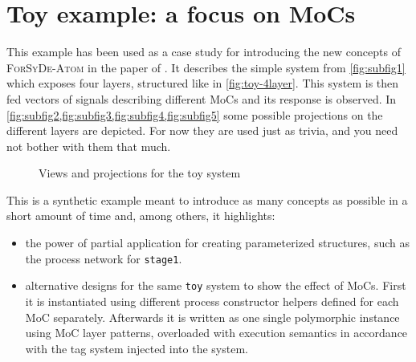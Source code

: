 \section{Toy example: a focus on MoCs}
\label{sec:getting-started:toy-example}

This example has been used as a case study for introducing the new concepts of \textsc{ForSyDe-Atom} in the paper of \cite{Ungureanu17}. It describes the simple system from \cref{fig:subfig1} which exposes four layers, structured like in \cref{fig:toy-4layer}. This system is then fed vectors of signals describing different MoCs and its response is observed. In \cref{fig:subfig2,fig:subfig3,fig:subfig4,fig:subfig5} some possible projections on the different layers are depicted. For now they are used just as trivia, and you need not bother with them that much.
\vspace{-.4cm}
\begin{figure}[ht!]
  \centering
  \hfill
  \hfill
  \hfill
  \hfill
  \hfill
\caption{Views and projections for the toy system}\label{fig:application}
\end{figure}

This is a synthetic example meant to introduce as many concepts as possible in a short amount of time and, among others, it highlights:
\begin{itemize}
\item the power of partial application for creating parameterized structures, such as the process network for \texttt{stage1}.
\item alternative designs for the same \texttt{toy} system to show the effect of MoCs. First it is instantiated using different process constructor helpers defined for each MoC separately. Afterwards it is written as one single polymorphic instance using MoC layer patterns, overloaded with execution semantics in accordance with the tag system injected into the system.
\end{itemize}

